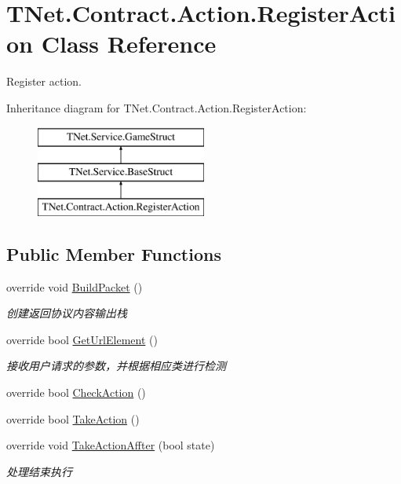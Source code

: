 \hypertarget{class_t_net_1_1_contract_1_1_action_1_1_register_action}{}\section{T\+Net.\+Contract.\+Action.\+Register\+Action Class Reference}
\label{class_t_net_1_1_contract_1_1_action_1_1_register_action}


Register action.  


Inheritance diagram for T\+Net.\+Contract.\+Action.\+Register\+Action\+:\begin{figure}[H]
\begin{center}
\leavevmode
\includegraphics[height=3.000000cm]{class_t_net_1_1_contract_1_1_action_1_1_register_action}
\end{center}
\end{figure}
\subsection*{Public Member Functions}
\begin{DoxyCompactItemize}
\item 
override void \mbox{\hyperlink{class_t_net_1_1_contract_1_1_action_1_1_register_action_a6640b98c166bee0a946e5a89916f8f73}{Build\+Packet}} ()
\begin{DoxyCompactList}\small\item\em 创建返回协议内容输出栈 \end{DoxyCompactList}\item 
override bool \mbox{\hyperlink{class_t_net_1_1_contract_1_1_action_1_1_register_action_a54a3217dcd82c930565220bbffb44165}{Get\+Url\+Element}} ()
\begin{DoxyCompactList}\small\item\em 接收用户请求的参数，并根据相应类进行检测 \end{DoxyCompactList}\item 
override bool \mbox{\hyperlink{class_t_net_1_1_contract_1_1_action_1_1_register_action_a5e3d02e2ac91b5d26911619b59e65050}{Check\+Action}} ()
\item 
override bool \mbox{\hyperlink{class_t_net_1_1_contract_1_1_action_1_1_register_action_ad8844eaa6365b2b6b200634a1e860e1e}{Take\+Action}} ()
\item 
override void \mbox{\hyperlink{class_t_net_1_1_contract_1_1_action_1_1_register_action_a76541dd3c1e60c99d2c5aa1f55be3f74}{Take\+Action\+Affter}} (bool state)
\begin{DoxyCompactList}\small\item\em 处理结束执行 \end{DoxyCompactList}\end{DoxyCompactItemize}
